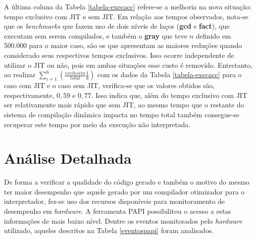 
A última coluna da Tabela \ref{tabela-execacc} refere-se a melhoria na
nova situação: tempo exclusivo com JIT e sem JIT.
Em relação aos tempos observados, nota-se que os \textit{benchmarks} que fazem
uso de dois níveis de laços (\textbf{gcd} e \textbf{fact}), que
executam sem serem compilados, e
também o \textbf{gray} que teve $n$ definido em 500.000 para o maior
caso, são os que apresentam as maiores reduções quando
considerado seus respectivos tempos exclusivos. Isso ocorre
independente de utilizar o JIT ou não, pois em ambas situações esse
custo é removido. Entretanto, ao realizar 
$\sum_{i = 1}^{6} \left( \frac{exclusivo}{total} \frac{1}{6} \right)$
com os dados da Tabela
\ref{tabela-execacc} para o caso com JIT e o
caso sem JIT, verifica-se que os valores obtidos são, respectivamente,
$0,59$ e $0,77$. Isso indica que, além do tempo exclusivo com JIT ser
relativamente mais rápido que sem JIT, ao mesmo tempo que o restante
do sistema de compilação dinâmica impacta no tempo total também
consegue-se recuperar este tempo por meio da execução não interpretada.


\section{Análise Detalhada}

De forma a verificar a qualidade do código gerado e também o motivo
do mesmo ter maior desempenho que aquele gerado por um compilador
otimizador para o interpretador, fez-se uso dos recursos disponíveis
para monitoramento de desempenho em \textit{hardware}. A ferramenta
PAPI possibilitou o acesso a estas informações de mais baixo
nível. Dentre os eventos monitorados pelo \textit{hardware} utilizado,
aqueles descritos na Tabela \ref{eventospapi} foram analisados.

